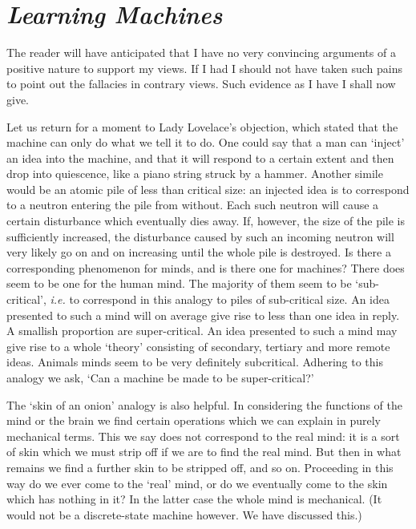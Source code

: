     \section{\textit{Learning Machines}}
    
    The reader will have anticipated that I have no very convincing arguments of a positive nature to support my views. If I had I should not have taken such pains to point out the fallacies in contrary views. Such evidence as I have I shall now give.

    Let us return for a moment to Lady Lovelace's objection, which stated that the machine can only do what we tell it to do. One could say that a man can ‘inject' an idea into the machine, and that it will respond to a certain extent and then drop into quiescence, like a piano string struck by a hammer. Another simile would be an atomic pile of less than critical size: an injected idea is to correspond to a neutron entering the pile from without. Each such neutron will cause a certain disturbance which eventually dies away. If, however, the size of the pile is sufficiently increased, the disturbance caused by such an incoming neutron will very likely go on and on increasing until the whole pile is destroyed. Is there a corresponding phenomenon for minds, and is there one for machines? There does seem to be one for the human mind. The majority of them seem to be ‘sub-critical', \textit{i.e.} to correspond in this analogy to piles of sub-critical size. An idea presented to such a mind will on average give rise to less than one idea in reply. A smallish proportion are super-critical. An idea presented to such a mind may give rise to a whole ‘theory' consisting of secondary, tertiary and more remote ideas. Animals minds seem to be very definitely subcritical. Adhering to this analogy we ask, ‘Can a machine be made to be super-critical?'

    The ‘skin of an onion' analogy is also helpful. In considering the functions of the mind or the brain we find certain operations which we can explain in purely mechanical terms. This we say does not correspond to the real mind: it is a sort of skin which we must strip off if we are to find the real mind. But then in what remains we find a further skin to be stripped off, and so on. Proceeding in this way do we ever come to the ‘real' mind, or do we eventually come to the skin which has nothing in it? In the latter case the whole mind is mechanical. (It would not be a discrete-state machine however. We have discussed this.)

